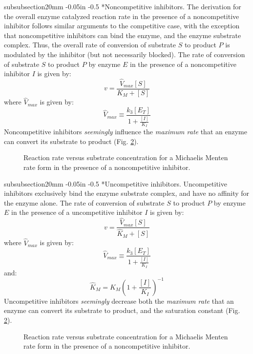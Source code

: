 \documentclass[11pt]{article}
\makeatletter
\theoremstyle{definition}
\renewcommand\subsubsection{\@startsection
	{subsubsection}{2}{0mm}
	{-0.05in}
	{-0.5\baselineskip}
	{\normalfont\normalsize\itshape}}
\makeatother
\begin{document}
\subsubsection*{Noncompetitive inhibitors.}
The derivation for the overall enzyme catalyzed reaction rate in the presence of a noncompetitive inhibitor
follows similar arguments to the competitive case, with the exception that noncompetitive inhibitors can bind the enzyme, and the enzyme substrate complex.
Thus, the overall rate of conversion of substrate $S$ to product $P$ is modulated by the inhibitor (but not necessarily blocked).
The rate of conversion of substrate $S$ to product $P$ by enzyme $E$ in the presence of a noncompetitive inhibitor $I$ is given by:
\begin{equation}
	v = \frac{\hat{V}_{max}\left[S\right]}{K_{M}+\left[S\right]}
\end{equation}where $\hat{V}_{max}$ is given by:
\begin{equation}
	\hat{V}_{max} \equiv \frac{k_{3}\left[E_{T}\right]}{1+\frac{\left[I\right]}{K_{I}}}
\end{equation}
Noncompetitive inhibitors \emph{seemingly} influence the \emph{maximum rate} that an enzyme can convert its substrate to product (Fig. \ref{fig-mm-plot-nci}).
\begin{figure}[!h]\centering
{}
\caption{Reaction rate versus substrate concentration for a Michaelis Menten rate form in the presence of a noncompetitive inhibitor.}\label{fig-mm-plot-nci}
\end{figure}

\subsubsection*{Uncompetitive inhibitors.}
Uncompetitive inhibitors exclusively bind the enzyme substrate complex, and have no affinity for the enzyme alone.
The rate of conversion of substrate $S$ to product $P$ by enzyme $E$ in the presence of a uncompetitive inhibitor $I$ is given by:
\begin{equation}
	v = \frac{\hat{V}_{max}\left[S\right]}{\hat{K}_{M}+\left[S\right]}
\end{equation}where $\hat{V}_{max}$ is given by:
\begin{equation}
	\hat{V}_{max} \equiv \frac{k_{3}\left[E_{T}\right]}{1+\frac{\left[I\right]}{K_{I}}}
\end{equation}and:
\begin{equation}
	\hat{K}_{M} = K_{M}\left({1+\frac{\left[I\right]}{K_{I}}}\right)^{-1}
\end{equation}
Uncompetitive inhibitors \emph{seemingly} decrease both the \emph{maximum rate} that an enzyme can convert its substrate to product, and the saturation constant (Fig. \ref{fig-mm-plot-nci}).
\begin{figure}[!ht]\centering
{}
\caption{Reaction rate versus substrate concentration for a Michaelis Menten rate form in the presence of a noncompetitive inhibitor.}\label{fig-mm-plot-nci}
\end{figure}

\clearpage


\end{document}

